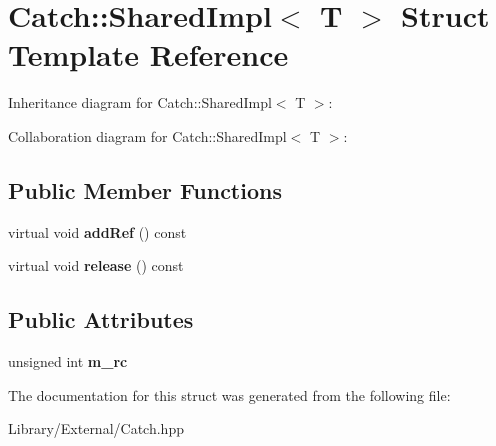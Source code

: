 \hypertarget{struct_catch_1_1_shared_impl}{}\section{Catch\+:\+:Shared\+Impl$<$ T $>$ Struct Template Reference}
\label{struct_catch_1_1_shared_impl}


Inheritance diagram for Catch\+:\+:Shared\+Impl$<$ T $>$\+:


Collaboration diagram for Catch\+:\+:Shared\+Impl$<$ T $>$\+:
\subsection*{Public Member Functions}
\begin{DoxyCompactItemize}
\item 
\hypertarget{struct_catch_1_1_shared_impl_a9b190b7a139a09d2624d1201d8e4f87e}{}virtual void {\bfseries add\+Ref} () const \label{struct_catch_1_1_shared_impl_a9b190b7a139a09d2624d1201d8e4f87e}

\item 
\hypertarget{struct_catch_1_1_shared_impl_a16baad80ad5ad3dfaf2a10a157a02e01}{}virtual void {\bfseries release} () const \label{struct_catch_1_1_shared_impl_a16baad80ad5ad3dfaf2a10a157a02e01}

\end{DoxyCompactItemize}
\subsection*{Public Attributes}
\begin{DoxyCompactItemize}
\item 
\hypertarget{struct_catch_1_1_shared_impl_a7e71ef1985b85aa41a1632f932a96bcb}{}unsigned int {\bfseries m\+\_\+rc}\label{struct_catch_1_1_shared_impl_a7e71ef1985b85aa41a1632f932a96bcb}

\end{DoxyCompactItemize}


The documentation for this struct was generated from the following file\+:\begin{DoxyCompactItemize}
\item 
Library/\+External/Catch.\+hpp\end{DoxyCompactItemize}
